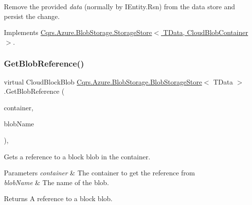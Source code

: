Remove the provided {\itshape data}  (normally by I\+Entity.\+Rsn) from the data store and persist the change. 



Implements \hyperlink{classCqrs_1_1Azure_1_1BlobStorage_1_1StorageStore_a9879b4ab18c2a33d7e20bc0b3a734195_a9879b4ab18c2a33d7e20bc0b3a734195}{Cqrs.\+Azure.\+Blob\+Storage.\+Storage\+Store$<$ T\+Data, Cloud\+Blob\+Container $>$}.

\mbox{\label{classCqrs_1_1Azure_1_1BlobStorage_1_1BlobStorageStore_a2d38c9a30365ae357f3cf5e300c6ca25_a2d38c9a30365ae357f3cf5e300c6ca25}} 
\subsubsection{\texorpdfstring{Get\+Blob\+Reference()}{GetBlobReference()}}
{\footnotesize\ttfamily virtual Cloud\+Block\+Blob \hyperlink{classCqrs_1_1Azure_1_1BlobStorage_1_1BlobStorageStore}{Cqrs.\+Azure.\+Blob\+Storage.\+Blob\+Storage\+Store}$<$ T\+Data $>$.Get\+Blob\+Reference (\begin{DoxyParamCaption}\item[{Cloud\+Blob\+Container}]{container,  }\item[{string}]{blob\+Name }\end{DoxyParamCaption})\hspace{0.3cm}{\ttfamily [protected]}, {\ttfamily [virtual]}}



Gets a reference to a block blob in the container. 


\begin{DoxyParams}{Parameters}
{\em container} & The container to get the reference from\\
\hline
{\em blob\+Name} & The name of the blob.\\
\hline
\end{DoxyParams}
\begin{DoxyReturn}{Returns}
A reference to a block blob.
\end{DoxyReturn}
\mbox{\label{classCqrs_1_1Azure_1_1BlobStorage_1_1BlobStorageStore_a96064e01ccf12413582acd7497f3802d_a96064e01ccf12413582acd7497f3802d}} 
